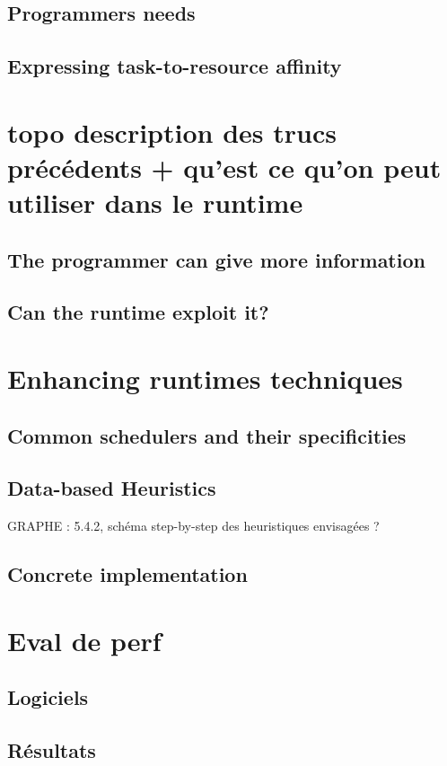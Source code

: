 \subsection{Programmers needs}
\subsection{Expressing task-to-resource affinity}

\section{topo description des trucs précédents + qu'est ce qu'on peut utiliser dans le runtime}
\subsection{The programmer can give more information}
\subsection{Can the runtime exploit it?}

\section{Enhancing runtimes techniques}
\subsection{Common schedulers and their specificities}
\subsection{Data-based Heuristics}
GRAPHE : 5.4.2, schéma step-by-step des heuristiques envisagées ?
\subsection{Concrete implementation}

\section{Eval de perf}
\subsection{Logiciels}
\subsection{Résultats}

